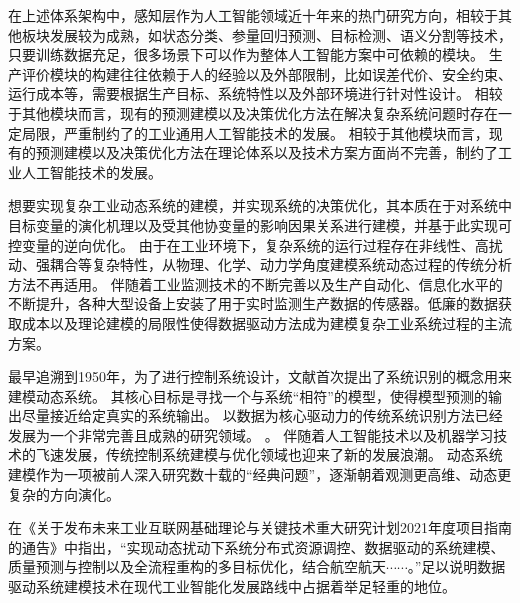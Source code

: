 在上述体系架构中，感知层作为人工智能领域近十年来的热门研究方向，相较于其他板块发展较为成熟，如状态分类、参量回归预测、目标检测、语义分割等技术，只要训练数据充足，很多场景下可以作为整体人工智能方案中可依赖的模块。
生产评价模块的构建往往依赖于人的经验以及外部限制，比如误差代价、安全约束、运行成本等，需要根据生产目标、系统特性以及外部环境进行针对性设计。
相较于其他模块而言，现有的预测建模以及决策优化方法在解决复杂系统问题时存在一定局限，严重制约了的工业通用人工智能技术的发展。
相较于其他模块而言，现有的预测建模以及决策优化方法在理论体系以及技术方案方面尚不完善，制约了工业人工智能技术的发展。

想要实现复杂工业动态系统的建模，并实现系统的决策优化，其本质在于对系统中目标变量的演化机理以及受其他协变量的影响因果关系进行建模，并基于此实现可控变量的逆向优化。
由于在工业环境下，复杂系统的运行过程存在非线性、高扰动、强耦合等复杂特性，从物理、化学、动力学角度建模系统动态过程的传统分析方法不再适用。
伴随着工业监测技术的不断完善以及生产自动化、信息化水平的不断提升，各种大型设备上安装了用于实时监测生产数据的传感器。低廉的数据获取成本以及理论建模的局限性使得数据驱动方法成为建模复杂工业系统过程的主流方案。

最早追溯到1950年，为了进行控制系统设计，文献\cite{zadeh1956identification}首次提出了系统识别的概念用来建模动态系统。
其核心目标是寻找一个与系统“相符”的模型，使得模型预测的输出尽量接近给定真实的系统输出。
以数据为核心驱动力的传统系统识别方法已经发展为一个非常完善且成熟的研究领域。
\cite{le2013system,gevers2006personal,ljung2008perspectives,ljung2011four,Ljung2020}。
伴随着人工智能技术以及机器学习技术的飞速发展，传统控制系统建模与优化领域也迎来了新的发展浪潮。
动态系统建模作为一项被前人深入研究数十载的“经典问题”，逐渐朝着观测更高维、动态更复杂的方向演化。

在《关于发布未来工业互联网基础理论与关键技术重大研究计划2021年度项目指南的通告》中指出，“实现动态扰动下系统分布式资源调控、数据驱动的系统建模、质量预测与控制以及全流程重构的多目标优化，结合航空航天$\cdots\cdots$。”足以说明数据驱动系统建模技术在现代工业智能化发展路线中占据着举足轻重的地位。

